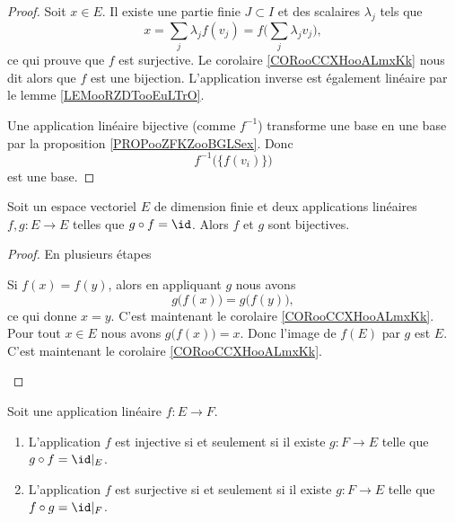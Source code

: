\begin{proof}
	Soit \( x\in E\). Il existe une partie finie \( J\subset I\) et des scalaires \( \lambda_j\) tels que
	\begin{equation}
		x=\sum_j\lambda_jf(v_j)=f\big( \sum_j\lambda_jv_j \big),
	\end{equation}
	ce qui prouve que \( f\) est surjective. Le corolaire \ref{CORooCCXHooALmxKk} nous dit alors que \( f\) est une bijection. L'application inverse est également linéaire par le lemme \ref{LEMooRZDTooEuLTrO}.

	Une application linéaire bijective (comme \( f^{-1}\)) transforme une base en une base par la proposition \ref{PROPooZFKZooBGLSex}. Donc
	\begin{equation}
		f^{-1}\big( \{f(v_i)\} \big)
	\end{equation}
	est une base.
\end{proof}

\begin{proposition}     \label{PROPooADESooATJSrH}
	Soit un espace vectoriel \( E\) de dimension finie et deux applications linéaires \( f,g\colon E\to E\) telles que \( g\circ f=\id\). Alors \( f\) et \( g\) sont bijectives.
\end{proposition}

\begin{proof}
	En plusieurs étapes
	\begin{subproof}
		Si \( f(x)=f(y)\), alors en appliquant \( g\) nous avons
		\begin{equation}
			g\big( f(x) \big)=g\big( f(y) \big),
		\end{equation}
		ce qui donne \( x=y\).
		C'est maintenant le corolaire \ref{CORooCCXHooALmxKk}.
		Pour tout \( x\in E\) nous avons \( g\big( f(x) \big)=x\). Donc l'image de \( f(E)\) par \( g\) est \( E\).
		C'est maintenant le corolaire \ref{CORooCCXHooALmxKk}.
	\end{subproof}
\end{proof}

\begin{lemma}        \label{LEMooDAACooElDsYb}
	Soit une application linéaire \( f\colon E\to F\).
	\begin{enumerate}
		\item       \label{ITEMooEZEWooZGoqsZ}
		      L'application \( f\) est injective si et seulement si il existe \( g\colon F\to E\) telle que \( g\circ f=\id|_E\).
		\item
		      L'application \( f\) est surjective si et seulement si il existe \( g\colon F\to E\) telle que \( f\circ g=\id|_F\).
	\end{enumerate}
\end{lemma}

